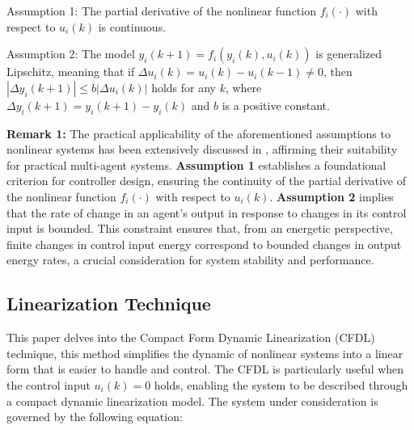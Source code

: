 \documentclass[journal,onecolumn]{IEEEtran}
\begin{document}
Assumption 1: The partial derivative of the nonlinear function \( f_i(\cdot) \) with respect to \( u_i(k) \) is continuous.

Assumption 2: The model \( y_i(k + 1) = f_i(y_i(k), u_i(k)) \) is generalized Lipschitz, meaning that if \( \Delta u_i(k) = u_i(k) - u_i(k - 1) \neq 0 \), then \( | \Delta y_i(k + 1) | \leq b |\Delta u_i(k)| \) holds for any \( k \), where \( \Delta y_i(k + 1) = y_i(k + 1) - y_i(k) \) and \( b \) is a positive constant.

\textbf{Remark 1:} The practical applicability of the aforementioned assumptions to nonlinear systems has been extensively discussed in \cite{reference24}, affirming their suitability for practical multi-agent systems. \textbf{Assumption 1} establishes a foundational criterion for controller design, ensuring the continuity of the partial derivative of the nonlinear function $f_i(\cdot)$ with respect to $u_i(k)$. \textbf{Assumption 2} implies that the rate of change in an agent's output in response to changes in its control input is bounded. This constraint ensures that, from an energetic perspective, finite changes in control input energy correspond to bounded changes in output energy rates, a crucial consideration for system stability and performance.

\subsection{Linearization Technique}

This paper delves into the Compact Form Dynamic Linearization (CFDL) technique, this method simplifies the dynamic of nonlinear systems into a linear form that is easier to handle and control. The CFDL is particularly useful when the control input \(u_i(k) = 0\) holds, enabling the system to be described through a compact dynamic linearization model. The system under consideration is governed by the following equation:


     


 




\end{document}
